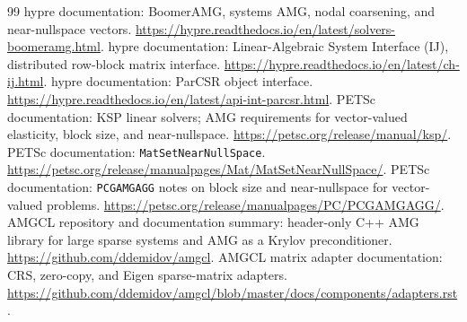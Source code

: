 \documentclass[10pt,a4paper]{article}
\newcommand{\code}[1]{\texttt{#1}}
\begin{document}
\begin{thebibliography}{99}
 hypre documentation: BoomerAMG, systems AMG, nodal coarsening, and near-nullspace vectors. \url{https://hypre.readthedocs.io/en/latest/solvers-boomeramg.html}.
 hypre documentation: Linear-Algebraic System Interface (IJ), distributed row-block matrix interface. \url{https://hypre.readthedocs.io/en/latest/ch-ij.html}.
 hypre documentation: ParCSR object interface. \url{https://hypre.readthedocs.io/en/latest/api-int-parcsr.html}.
 PETSc documentation: KSP linear solvers; AMG requirements for vector-valued elasticity, block size, and near-nullspace. \url{https://petsc.org/release/manual/ksp/}.
 PETSc documentation: \code{MatSetNearNullSpace}. \url{https://petsc.org/release/manualpages/Mat/MatSetNearNullSpace/}.
 PETSc documentation: \code{PCGAMGAGG} notes on block size and near-nullspace for vector-valued problems. \url{https://petsc.org/release/manualpages/PC/PCGAMGAGG/}.
 AMGCL repository and documentation summary: header-only C++ AMG library for large sparse systems and AMG as a Krylov preconditioner. \url{https://github.com/ddemidov/amgcl}.
 AMGCL matrix adapter documentation: CRS, zero-copy, and Eigen sparse-matrix adapters. \url{https://github.com/ddemidov/amgcl/blob/master/docs/components/adapters.rst}.

\end{thebibliography}
\end{document}
